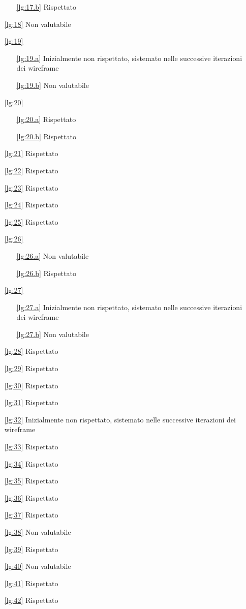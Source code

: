 \begin{itemize}
\begin{itemize}
        \item[\ref{lg:17.b}] Rispettato
    \end{itemize}
    \item[\ref{lg:18}] Non valutabile
    \item[\ref{lg:19}] \begin{itemize}
        \item[\ref{lg:19.a}] Inizialmente non rispettato, sistemato nelle successive iterazioni dei wireframe
        \item[\ref{lg:19.b}] Non valutabile
    \end{itemize}
    \item[\ref{lg:20}] \begin{itemize}
        \item[\ref{lg:20.a}] Rispettato
        \item[\ref{lg:20.b}] Rispettato
    \end{itemize}
    \item[\ref{lg:21}] Rispettato
    \item[\ref{lg:22}] Rispettato
    \item[\ref{lg:23}] Rispettato
    \item[\ref{lg:24}] Rispettato
    \item[\ref{lg:25}] Rispettato
    \item[\ref{lg:26}] \begin{itemize}
        \item[\ref{lg:26.a}] Non valutabile
        \item[\ref{lg:26.b}] Rispettato
    \end{itemize}
    \item[\ref{lg:27}] \begin{itemize}
        \item[\ref{lg:27.a}] Inizialmente non rispettato, sistemato nelle successive iterazioni dei wireframe
        \item[\ref{lg:27.b}] Non valutabile
    \end{itemize}
    \item[\ref{lg:28}] Rispettato
    \item[\ref{lg:29}] Rispettato
    \item[\ref{lg:30}] Rispettato
    \item[\ref{lg:31}] Rispettato
    \item[\ref{lg:32}] Inizialmente non rispettato, sistemato nelle successive iterazioni dei wireframe
    \item[\ref{lg:33}] Rispettato
    \item[\ref{lg:34}] Rispettato
    \item[\ref{lg:35}] Rispettato
    \item[\ref{lg:36}] Rispettato
    \item[\ref{lg:37}] Rispettato
    \item[\ref{lg:38}] Non valutabile
    \item[\ref{lg:39}] Rispettato
    \item[\ref{lg:40}] Non valutabile
    \item[\ref{lg:41}] Rispettato
    \item[\ref{lg:42}] Rispettato
\end{itemize}